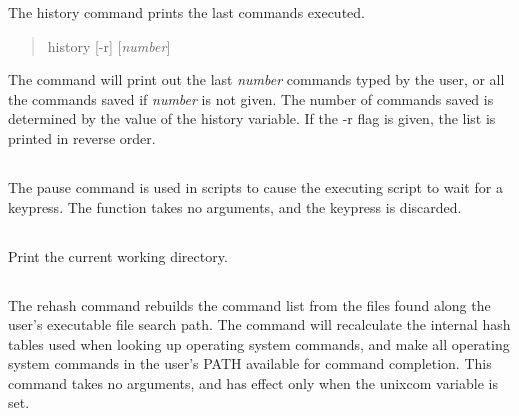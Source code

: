
The {\cb history} command prints the last commands executed.
\begin{quote}\vt
history [-r] [{\it number\/}]
\end{quote}
The command will print out the last {\it number} commands typed by the
user, or all the commands saved if {\it number} is not given.  The
number of commands saved is determined by the value of the {\et
history} variable.  If the {\vt -r} flag is given, the list is printed
in reverse order.

\subsection{}


The {\cb pause} command is used in scripts to cause the executing
script to wait for a keypress.  The function takes no arguments, and
the keypress is discarded.

\subsection{}


Print the current working directory.

\subsection{}


The {\cb rehash} command rebuilds the command list from the files
found along the user's executable file search path.  The command
will recalculate the internal hash tables used when looking up
operating system commands, and make all operating system commands in
the user's {\et PATH} available for command completion.  This
command takes no arguments, and has effect only when the {\et
unixcom} variable is set.

\subsection{}
\label{setcmd}

